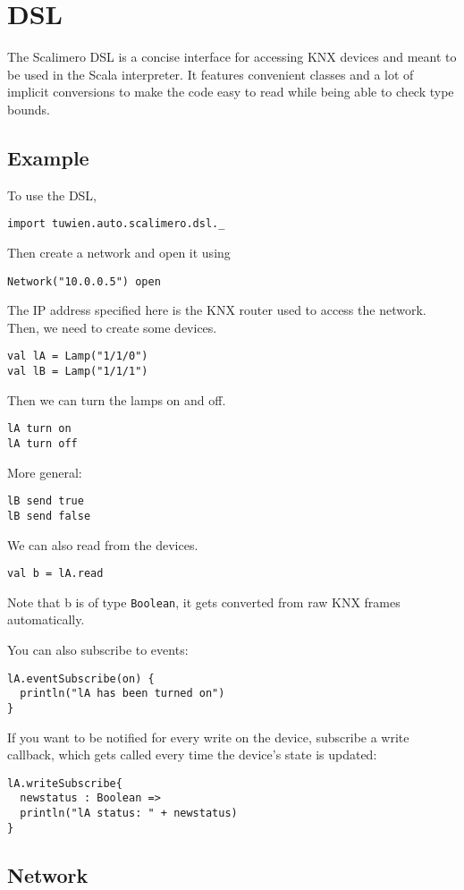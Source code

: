 \chapter{DSL}
The Scalimero DSL is a concise interface for accessing KNX devices and meant to be used in the Scala interpreter. It features convenient classes and a lot of implicit conversions to make the code easy to read while being able to check type bounds.

\section{Example}
To use the DSL,
\begin{lstlisting}
import tuwien.auto.scalimero.dsl._
\end{lstlisting}
Then create a network and open it using
\begin{lstlisting}
Network("10.0.0.5") open
\end{lstlisting}
The IP address specified here is the KNX router used to access the network. Then, we need to create some devices.
\begin{lstlisting}
val lA = Lamp("1/1/0")
val lB = Lamp("1/1/1")
\end{lstlisting}
Then we can turn the lamps on and off.
\begin{lstlisting}
lA turn on
lA turn off
\end{lstlisting}
More general:
\begin{lstlisting}
lB send true
lB send false
\end{lstlisting}
We can also read from the devices.
\begin{lstlisting}
val b = lA.read
\end{lstlisting}
Note that b is of type \lstinline!Boolean!, it gets converted from raw KNX frames automatically.

You can also subscribe to events:
\begin{lstlisting}
lA.eventSubscribe(on) {
  println("lA has been turned on")
}
\end{lstlisting}

If you want to be notified for every write on the device, subscribe a write callback, which gets called every time the device's state is updated:
\begin{lstlisting}
lA.writeSubscribe{
  newstatus : Boolean =>
  println("lA status: " + newstatus)
}
\end{lstlisting}

\section{Network}


